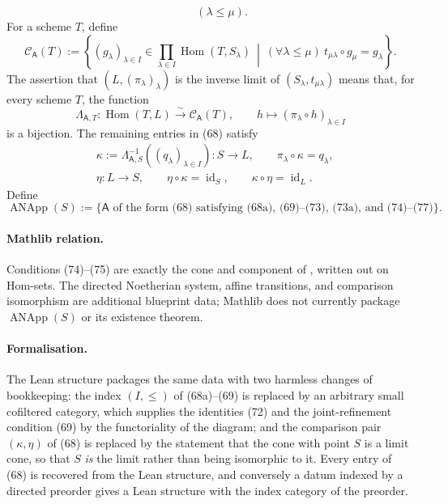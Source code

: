 \begin{definition}
\[      \qquad(\lambda\leq\mu).                                      \tag{73a}
  \]
  For a scheme \(T\), define
  \[
    \mathcal C_{\mathsf A}(T):=
      \left\{(g_\lambda)_{\lambda\in I}\in
        \prod_{\lambda\in I}\operatorname{Hom}(T,S_\lambda)
        \ \middle|\
        (\forall\lambda\leq\mu)\
          t_{\mu\lambda}\circ g_\mu=g_\lambda\right\}.              \tag{74}
  \]
  The assertion that \((L,(\pi_\lambda)_\lambda)\) is the inverse limit
  of \((S_\lambda,t_{\mu\lambda})\) means that, for every scheme \(T\),
  the function
  \[
    \Lambda_{\mathsf A,T}\colon
      \operatorname{Hom}(T,L)\xrightarrow{\sim}
      \mathcal C_{\mathsf A}(T),\qquad
      h\longmapsto(\pi_\lambda\circ h)_{\lambda\in I}               \tag{75}
  \]
  is a bijection.  The remaining entries in (68) satisfy
  \begin{align}
    &\kappa:=\Lambda_{\mathsf A,S}^{-1}
      ((q_\lambda)_{\lambda\in I})\colon S\to L,\qquad
    \pi_\lambda\circ\kappa=q_\lambda,                               \tag{76}\\
    &\eta\colon L\to S,\qquad
    \eta\circ\kappa=\operatorname{id}_S,\qquad
    \kappa\circ\eta=\operatorname{id}_L.                            \tag{77}
  \end{align}
  Define
  \[
    \operatorname{ANApp}(S):=
      \{\mathsf A\text{ of the form (68) satisfying
        (68a), (69)--(73), (73a), and (74)--(77)}\}.                 \tag{78}
  \]

  \paragraph{Mathlib relation.}
  Conditions (74)--(75) are exactly the cone and
  \texttt{} component of
  \Cref{def:nagata-limit-datum}, written out on Hom-sets.  The directed
  Noetherian system, affine transitions, and comparison isomorphism are
  additional blueprint data; Mathlib does not currently package
  $\operatorname{ANApp}(S)$ or its existence theorem.

  \paragraph{Formalisation.}
  The Lean structure
  \texttt{}
  packages the same data with two harmless changes of bookkeeping: the index
  $(I,\leq)$ of (68a)--(69) is replaced by an arbitrary small cofiltered
  category, which supplies the identities (72) and the joint-refinement
  condition (69) by the functoriality of the diagram; and the comparison pair
  $(\kappa,\eta)$ of (68) is replaced by the statement that the cone with point
  $S$ is a limit cone, so that $S$ \emph{is} the limit rather than being
  isomorphic to it.  Every entry of (68) is recovered from the Lean structure,
  and conversely a datum indexed by a directed preorder gives a Lean structure
  with the index category of the preorder.
\end{definition}

